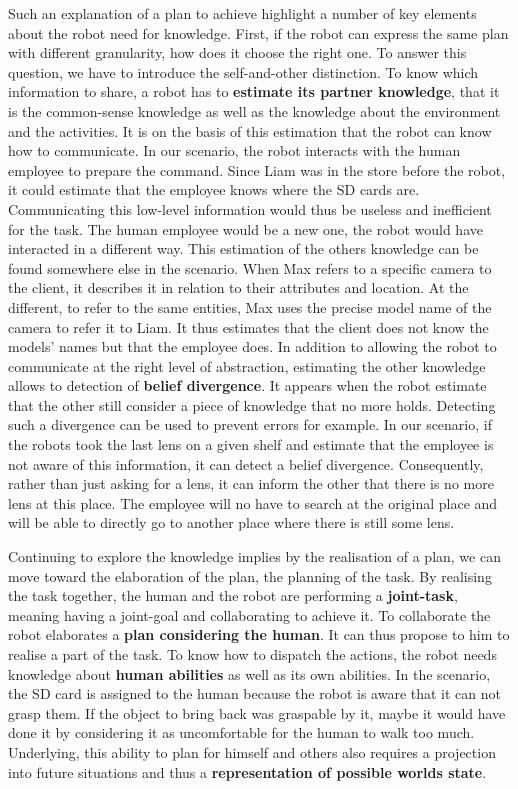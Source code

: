 Such an explanation of a plan to achieve highlight a number of key elements about the robot need for knowledge. First, if the robot can express the same plan with different granularity, how does it choose the right one. To answer this question, we have to introduce the self-and-other distinction. To know which information to share, a robot has to \textbf{estimate its partner knowledge}, that it is the common-sense knowledge as well as the knowledge about the environment and the activities. It is on the basis of this estimation that the robot can know how to communicate. In our scenario, the robot interacts with the human employee to prepare the command. Since Liam was in the store before the robot, it could estimate that the employee knows where the SD cards are. Communicating this low-level information would thus be useless and inefficient for the task. The human employee would be a new one, the robot would have interacted in a different way. This estimation of the others knowledge can be found somewhere else in the scenario. When Max refers to a specific camera to the client, it describes it in relation to their attributes and location. At the different, to refer to the same entities, Max uses the precise model name of the camera to refer it to Liam. It thus estimates that the client does not know the models' names but that the employee does. In addition to allowing the robot to communicate at the right level of abstraction, estimating the other knowledge allows to detection of \textbf{belief divergence}. It appears when the robot estimate that the other still consider a piece of knowledge that no more holds. Detecting such a divergence can be used to prevent errors for example. In our scenario, if the robots took the last lens on a given shelf and estimate that the employee is not aware of this information, it can detect a belief divergence. Consequently, rather than just asking for a lens, it can inform the other that there is no more lens at this place. The employee will no have to search at the original place and will be able to directly go to another place where there is still some lens.

Continuing to explore the knowledge implies by the realisation of a plan, we can move toward the elaboration of the plan, the planning of the task. By realising the task together, the human and the robot are performing a \textbf{joint-task}, meaning having a joint-goal and collaborating to achieve it. To collaborate the robot elaborates a \textbf{plan considering the human}. It can thus propose to him to realise a part of the task. To know how to dispatch the actions, the robot needs knowledge about \textbf{human abilities} as well as its own abilities. In the scenario, the SD card is assigned to the human because the robot is aware that it can not grasp them. If the object to bring back was graspable by it, maybe it would have done it by considering it as uncomfortable for the human to walk too much. Underlying, this ability to plan for himself and others also requires a projection into future situations and thus a \textbf{representation of possible worlds state}.

